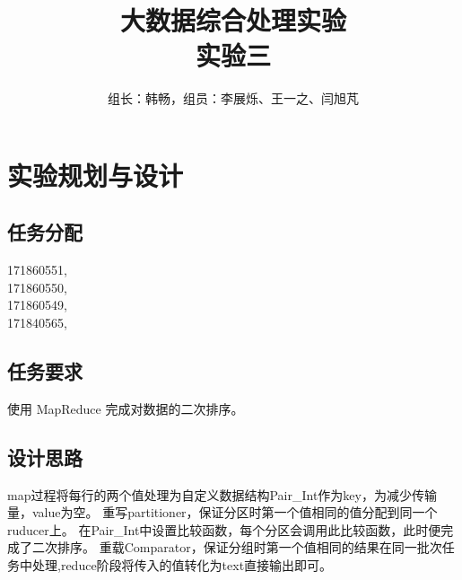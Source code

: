 \documentclass[a4paper,UTF8]{article}
\author{组长：韩畅，组员：李展烁、王一之、闫旭芃}
\numberwithin{equation}{section}
\begin{document}
{}
\title{大数据综合处理实验\\
实验三}
\maketitle

\section{实验规划与设计}
\subsection{任务分配}
{171860551, }\\ \indent
{171860550, }\\ \indent
{171860549, }\\ \indent
{171840565, }
\subsection{任务要求}
使用 MapReduce 完成对数据的二次排序。 
\subsection{设计思路}
map过程将每行的两个值处理为自定义数据结构Pair\_Int作为key，为减少传输量，value为空。
重写partitioner，保证分区时第一个值相同的值分配到同一个ruducer上。
在Pair\_Int中设置比较函数，每个分区会调用此比较函数，此时便完成了二次排序。
重载Comparator，保证分组时第一个值相同的结果在同一批次任务中处理,reduce阶段将传入的值转化为text直接输出即可。
\end{document}
